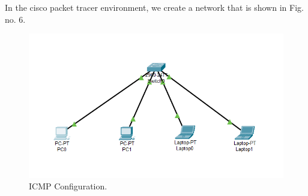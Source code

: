 \documentclass[12pt,a4paper]{article}
\begin{document}
In the cisco packet tracer environment, we create a network that is shown in Fig. no. 6.
\begin{figure}[h]
 		\centering
				\includegraphics[scale=0.75]{3.1.png}	
			\caption{ICMP Configuration.}
			\label{fig:AP}
	\end{figure}
\end{document}
